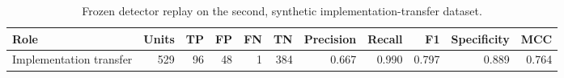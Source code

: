 \begin{table}[htbp]
\centering
\caption{Frozen detector replay on the second, synthetic implementation-transfer dataset.}
\label{tab:second-dataset-transfer}
\small
\begin{adjustbox}{max width=\textwidth}
\begin{tabular}{lrrrrrrrrrr}
\toprule
Role & Units & TP & FP & FN & TN & Precision & Recall & F1 & Specificity & MCC \\
\midrule
Implementation transfer & 529 & 96 & 48 & 1 & 384 & 0.667 & 0.990 & 0.797 & 0.889 & 0.764 \\
\bottomrule
\end{tabular}
\end{adjustbox}
\par{}
\par{}
\end{table}
